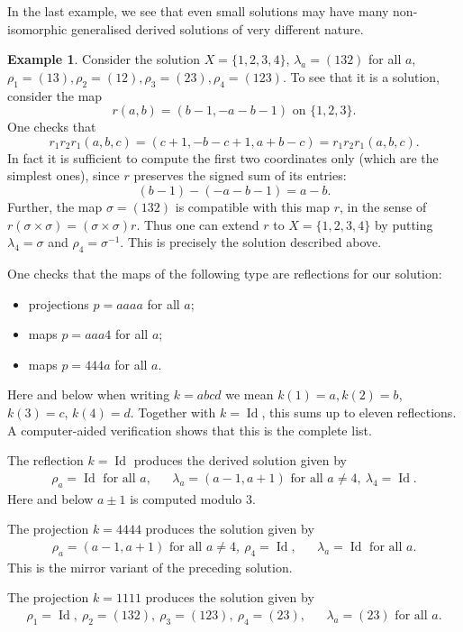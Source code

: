 \documentclass{amsart}
\newcommand{\id}{\operatorname{Id}}
\newcommand{\Id}{\operatorname{Id}}
\theoremstyle{plain}
\theoremstyle{definition}
\newtheorem{exa}[thm]{Example}
\theoremstyle{remark}
\begin{document}
In the last example, we see that even small solutions may have many non-isomorphic generalised derived solutions of very different nature.
\begin{exa}\label{EX:long}
Consider the solution $X=\{1,2,3,4\}$, $\lambda_a=(132)$ for all $a$, $\rho_1=(13), \rho_2=(12), \rho_3=(23), \rho_4=(123)$. To see that it is a solution, consider the map 
\[r(a,b)=(b-1,-a-b-1) \text{ on } \{1,2,3\}.\]
 \noindent One checks that 
\[r_1r_2r_1(a,b,c)=(c+1,-b-c+1,a+b-c)=r_1r_2r_1(a,b,c).\]
In fact it is sufficient to compute the first two coordinates only (which are the simplest ones), since $r$ preserves the signed sum of its entries:
\[(b-1)-(-a-b-1)=a-b.\]
Further, the map $\sigma=(132)$ is compatible with this map $r$, in the sense of $r(\sigma \times \sigma)=(\sigma \times \sigma)r$. Thus one can extend $r$ to $X=\{1,2,3,4\}$ by putting $\lambda_4=\sigma$ and $\rho_4=\sigma^{-1}$. This is precisely the solution described above. 

\noindent One checks that the maps of the following type are reflections for our solution:
\begin{itemize}
\item projections $p=aaaa$ for all $a$;
\item maps $p=aaa4$ for all $a$;
\item maps $p=444a$ for all $a$.
\end{itemize} 
Here and below when writing $k=abcd$ we mean $k(1)=a, k(2)=b$, $k(3)=c$, $k(4)=d$. Together with $k=\Id$, this sums up to eleven reflections. A computer-aided verification shows that this is the complete list.

\noindent The reflection $k=\Id$ produces the derived solution given by  
	\begin{align*}
	\rho_a=\Id \text{ for all } a, && \lambda_a=(a-1,a+1) \text{ for all } a \neq 4, \ \lambda_4=\Id.
	\end{align*}
Here and below $a \pm 1$ is computed modulo $3$.	

\noindent The projection $k=4444$ produces the solution given by
\begin{align*}
	\rho_a=(a-1,a+1) \text{ for all } a \neq 4, \ \rho_4=\Id,&&\lambda_a=\Id \text{ for all } a.
\end{align*}
This is the mirror variant of the preceding solution.

\noindent The projection $k=1111$ produces the solution given by
\begin{align*}
	\rho_1=\id,\ \rho_2=(132),\ \rho_3=(123),\ \rho_4=(23),&&\lambda_a=(23) \text{ for all } a.
\end{align*}


\end{exa}
\end{document}
